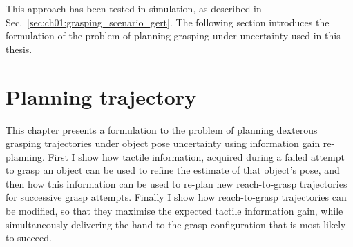 This approach has been tested in simulation, as described in Sec.~\ref{sec:ch01:grasping_scenario_gert}. 
The following section introduces the formulation of the problem of planning grasping under uncertainty used in this thesis.

\section{Planning trajectory}\label{sec:ch06:problem_domain}

This chapter presents a formulation to the problem of planning dexterous grasping trajectories under object pose uncertainty using information gain re-planning. First I show
how tactile information, acquired during a failed attempt to grasp an object can be used to refine the estimate of that object's pose, and then how this information can be used to re-plan new reach-to-grasp trajectories for successive grasp attempts. Finally I show how reach-to-grasp trajectories can be modified, so that they maximise the expected tactile information gain, while simultaneously delivering the hand to the grasp configuration that is most likely to succeed. 

